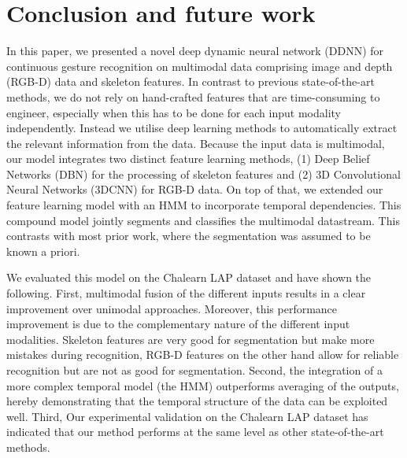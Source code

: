 
\section{Conclusion and future work}
\label{sec:conclusion}

%
In this paper, we presented a novel deep dynamic neural network (DDNN) for continuous gesture recognition on multimodal data comprising image and depth (RGB-D) data and skeleton features. %
In contrast to previous state-of-the-art methods, we do not rely on hand-crafted features that are time-consuming to engineer, especially when this has to be done for each input modality independently. Instead we utilise deep learning methods to automatically extract the relevant information from the data. 
Because the input data is multimodal, our model integrates two distinct feature learning methods, (1) Deep Belief Networks (DBN) for the processing of skeleton features and (2) 3D Convolutional Neural Networks (3DCNN) for RGB-D data. On top of that, we  extended our feature learning model with an HMM to incorporate temporal dependencies.
This compound model  jointly segments and classifies the multimodal datastream. This contrasts with most prior work, where the segmentation was assumed to be known a priori. 

We evaluated this model on the Chalearn LAP dataset and have shown the following.  First, multimodal fusion of the different inputs results in a clear improvement over unimodal approaches. Moreover, this performance improvement is due to the complementary nature of the different input modalities. Skeleton features are very good for segmentation but make more mistakes during recognition, RGB-D features on the other hand allow for reliable recognition but are not as good for segmentation.
Second, the integration of a more complex temporal model (the HMM) outperforms averaging of the outputs, hereby demonstrating that the temporal structure of the data can be exploited well. Third, 
Our experimental validation on the Chalearn LAP dataset has indicated that our method performs at the same level as other state-of-the-art methods. 

